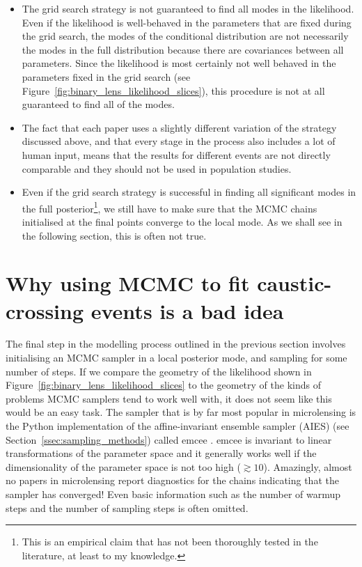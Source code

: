 \documentclass[12pt,dvipsnames]{report}
\newcommand{\ssf}[1]{\textsf{#1}}
\begin{document}
\begin{itemize}
\item The grid search strategy is not guaranteed to find all modes in the likelihood. 
Even if the likelihood is well-behaved in the parameters that are fixed during the grid search, 
the modes of the conditional distribution are not necessarily the modes 
in the full distribution because there are covariances between all parameters. Since 
the likelihood is most certainly not well behaved in the parameters fixed in the grid
search (see Figure~\ref{fig:binary_lens_likelihood_slices}), this procedure is not 
at all guaranteed to find all of the modes.
\item The fact that each paper uses a slightly different variation of the strategy discussed 
above, and that every stage in the process also includes a lot of human input, means that the 
results for different events are not directly comparable and they should not be used in 
population studies.
\item Even if the grid search strategy is successful in finding all significant modes in the full 
posterior\footnote{This is an empirical claim that has not been thoroughly 
tested in the literature, at least to my knowledge.}, we still have to make sure that 
the MCMC chains initialised at the final points converge to the local mode. As we shall see 
in the following section, this is often not true.
\end{itemize}

\section{Why using MCMC to fit caustic-crossing events is a bad idea}
The final step in the modelling process outlined in the previous section involves initialising
an MCMC sampler in a local posterior mode, and sampling for some number of steps. 
If we compare the geometry of the likelihood shown in Figure~\ref{fig:binary_lens_likelihood_slices}
to the geometry of the kinds of problems MCMC samplers tend to work well with, it does not 
seem like this would be an easy task. The sampler that is by far most popular in microlensing 
is the \ssf{Python} implementation of the affine-invariant ensemble sampler (AIES) (see 
Section~\ref{ssec:sampling_methods}) called \ssf{emcee} \citep{2013PASP..125..306F}.
\ssf{emcee} is invariant to linear transformations of the parameter space and it generally 
works well if the dimensionality of the parameter space is not too high ($\gtrsim 10$). 
Amazingly, almost no papers in microlensing report diagnostics for the chains indicating 
that the sampler has converged! Even basic information such as the number of warmup steps and 
the number of sampling steps is often omitted.
\end{document}
